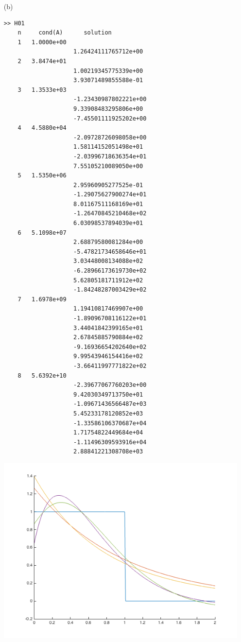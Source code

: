 \documentclass[11pt]{article}
\begin{document}
\begin{enumerate}
\begin{enumerate}
            \item[(b)]
                \begin{verbatim}
>> H01
    n     cond(A)      solution
    1   1.0000e+00
                    1.26424111765712e+00
    2   3.8474e+01
                    1.00219345775339e+00
                    3.93071489855588e-01
    3   1.3533e+03
                    -1.23430987802221e+00
                    9.33908483295806e+00
                    -7.45501111925202e+00
    4   4.5880e+04
                    -2.09728726098058e+00
                    1.58114152051498e+01
                    -2.03996718636354e+01
                    7.55105210089050e+00
    5   1.5350e+06
                    2.95960905277525e-01
                    -1.29075627900274e+01
                    8.01167511168169e+01
                    -1.26470845210468e+02
                    6.03098537894039e+01
    6   5.1098e+07
                    2.68879580081284e+00
                    -5.47821734658646e+01
                    3.03448008134088e+02
                    -6.28966173619730e+02
                    5.62805181711912e+02
                    -1.84248287003429e+02
    7   1.6978e+09
                    1.19410817469907e+00
                    -1.89096708116122e+01
                    3.44041842399165e+01
                    2.67845885790884e+02
                    -9.16936654202640e+02
                    9.99543946154416e+02
                    -3.66411997771822e+02
    8   5.6392e+10
                    -2.39677067760203e+00
                    9.42030349713750e+01
                    -1.09671436566487e+03
                    5.45233178120852e+03
                    -1.33586106370687e+04
                    1.71754822449684e+04
                    -1.11496309593916e+04
                    2.88841221308708e+03
                \end{verbatim}
                \includegraphics[scale=.3]{Figures/01_6.png}
                
        \end{enumerate}
\end{enumerate}
\end{document}
